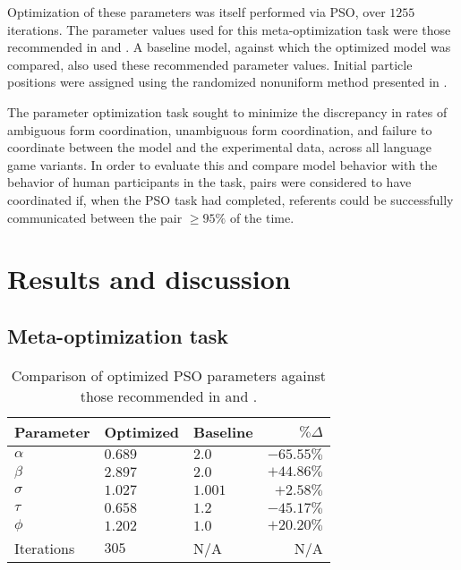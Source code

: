 \documentclass[11pt]{article}
\begin{document}
Optimization of these parameters was itself performed via PSO, over $1255$ iterations. The parameter values used for this meta-optimization task were those recommended in \cite{shi1998} and \cite{solnon2010}. A baseline model, against which the optimized model was compared, also used these recommended parameter values. Initial particle positions were assigned using the randomized nonuniform method presented in \cite{mitchell1991}. 

The parameter optimization task sought to minimize the discrepancy in rates of ambiguous form coordination, unambiguous form coordination, and failure to coordinate between the model and the experimental data, across all language game variants. In order to evaluate this and compare model behavior with the behavior of human participants in the task, pairs were considered to have coordinated if, when the PSO task had completed, referents could be successfully communicated between the pair $\geq 95\%$ of the time.



\section{Results and discussion}
\subsection{Meta-optimization task}
\label{sec:parameter_optimization}

\begin{table}[]
\begin{center}
    \begin{tabular}{ l l l r }
    Parameter  & Optimized & Baseline & $\% \Delta$ \\ \hline
    $\alpha$   & $0.689$   & $2.0$    & $-65.55\%$ \\ \hline
    $\beta$    & $2.897$   & $2.0$    & $+44.86\%$ \\ \hline
    $\sigma$   & $1.027$   & $1.001$  & $+2.58\%$\\ \hline
    $\tau$     & $0.658$   & $1.2$    & $-45.17\%$ \\ \hline
    $\phi$     & $1.202$   & $1.0$    & $+20.20\%$\\ \hline
    Iterations & $305$     & N/A      & N/A\\ 
    \end{tabular}
   	\caption{Comparison of optimized PSO parameters against those recommended in \cite{shi1998} and \cite{solnon2010}.}
	\label{table:1}
\end{center}
\end{table}
\end{document}
